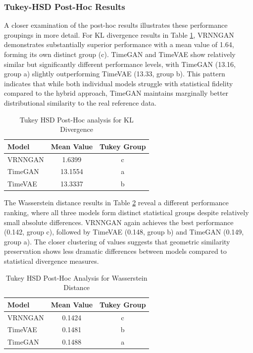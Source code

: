 \documentclass{article}
\begin{document}
\subsubsection{Tukey-HSD Post-Hoc Results}

A closer examination of the post-hoc results illustrates these performance groupings in more detail. For KL divergence results in Table \ref{tab:tukey_kl}, VRNNGAN demonstrates substantially superior performance with a mean value of 1.64, forming its own distinct group (c). TimeGAN and TimeVAE show relatively similar but significantly different performance levels, with TimeGAN (13.16, group a) slightly outperforming TimeVAE (13.33, group b). This pattern indicates that while both individual models struggle with statistical fidelity compared to the hybrid approach, TimeGAN maintains marginally better distributional similarity to the real reference data.

\begin{table}[H]
\centering
\caption{Tukey HSD Post-Hoc analysis for KL Divergence}
\label{tab:tukey_kl}
\begin{tabular}{lcc}
\toprule
\textbf{Model} & \textbf{Mean Value} & \textbf{Tukey Group} \\
\midrule
VRNNGAN & 1.6399 & c \\
TimeGAN & 13.1554 & a \\
TimeVAE & 13.3337 & b \\
\bottomrule
\end{tabular}
\footnotesize
\end{table}

The Wasserstein distance results in Table \ref{tab:tukey_wasserstein} reveal a different performance ranking, where all three models form distinct statistical groups despite relatively small absolute differences. VRNNGAN again achieves the best performance (0.142, group c), followed by TimeVAE (0.148, group b) and TimeGAN (0.149, group a). The closer clustering of values suggests that geometric similarity preservation shows less dramatic differences between models compared to statistical divergence measures.

\begin{table}[H]
\centering
\caption{Tukey HSD Post-Hoc Analysis for Wasserstein Distance}
\label{tab:tukey_wasserstein}
\begin{tabular}{lcc}
\toprule
\textbf{Model} & \textbf{Mean Value} & \textbf{Tukey Group} \\
\midrule
VRNNGAN & 0.1424 & c \\
TimeVAE & 0.1481 & b \\
TimeGAN & 0.1488 & a \\
\bottomrule
\end{tabular}
\footnotesize
\end{table}
\end{document}
